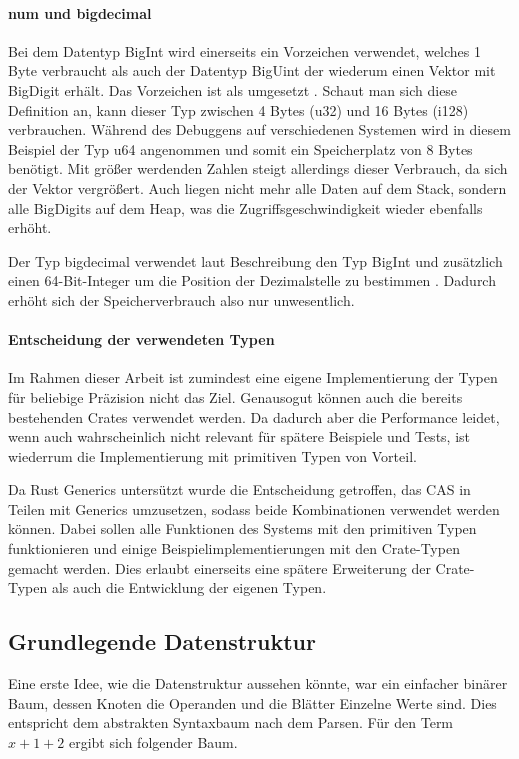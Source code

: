 \documentclass[11pt,a4paper, ngerman]{article}
\begin{document}
\paragraph{num und bigdecimal} Bei dem Datentyp BigInt wird einerseits ein Vorzeichen verwendet, welches 1 Byte verbraucht \cite{EnumSize} als auch der Datentyp BigUint der wiederum einen Vektor mit BigDigit erhält. Das Vorzeichen ist als  umgesetzt \cite{BigIntSign}. Schaut man sich diese Definition an, kann dieser Typ zwischen 4 Bytes (u32) und 16 Bytes (i128) verbrauchen. Während des Debuggens auf verschiedenen Systemen wird in diesem Beispiel der Typ u64 angenommen und somit ein Speicherplatz von 8 Bytes benötigt. Mit größer werdenden Zahlen steigt allerdings dieser Verbrauch, da sich der Vektor vergrößert. Auch liegen nicht mehr alle Daten auf dem Stack, sondern alle BigDigits auf dem Heap, was die Zugriffsgeschwindigkeit wieder ebenfalls erhöht.

Der Typ bigdecimal verwendet laut Beschreibung den Typ BigInt und zusätzlich einen 64-Bit-Integer um die Position der Dezimalstelle zu bestimmen \cite{CrateBigdecimalDocs}. Dadurch erhöht sich der Speicherverbrauch also nur unwesentlich.

\paragraph{Entscheidung der verwendeten Typen} Im Rahmen dieser Arbeit ist zumindest eine eigene Implementierung der Typen für beliebige Präzision nicht das Ziel. Genausogut können auch die bereits bestehenden Crates verwendet werden. Da dadurch aber die Performance leidet, wenn auch wahrscheinlich nicht relevant für spätere Beispiele und Tests, ist wiederrum die Implementierung mit primitiven Typen von Vorteil.

Da Rust Generics untersützt wurde die Entscheidung getroffen, das CAS in Teilen mit Generics umzusetzen, sodass beide Kombinationen verwendet werden können. Dabei sollen alle Funktionen des Systems mit den primitiven Typen funktionieren und einige Beispielimplementierungen mit den Crate-Typen gemacht werden. Dies erlaubt einerseits eine spätere Erweiterung der Crate-Typen als auch die Entwicklung der eigenen Typen.

\subsection{Grundlegende Datenstruktur}
Eine erste Idee, wie die Datenstruktur aussehen könnte, war ein einfacher binärer Baum, dessen Knoten die Operanden und die Blätter Einzelne Werte sind. Dies entspricht dem abstrakten Syntaxbaum nach dem Parsen. Für den Term $x+1+2$ ergibt sich folgender Baum.
\end{document}
